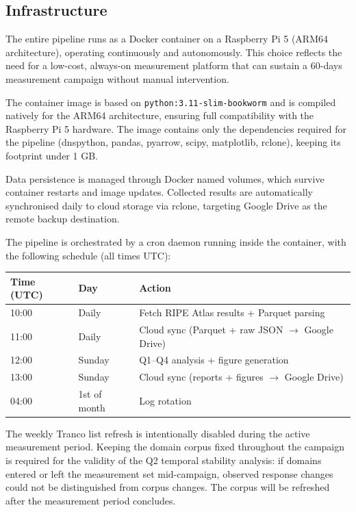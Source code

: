 \subsection{Infrastructure}
\label{subsec:3.1.3}

The entire pipeline runs as a Docker container on a Raspberry Pi 5 (ARM64 architecture), operating continuously and autonomously. This choice reflects the need for a low-cost, always-on measurement platform that can sustain a 60-days measurement campaign without manual intervention.

The container image is based on \texttt{python:3.11-slim-bookworm} and is compiled natively for the ARM64 architecture, ensuring full compatibility with the Raspberry Pi 5 hardware. The image contains only the dependencies required for the pipeline (dnspython, pandas, pyarrow, scipy, matplotlib, rclone), keeping its footprint under 1 GB.

Data persistence is managed through Docker named volumes, which survive container restarts and image updates. Collected results are automatically synchronised daily to cloud storage via rclone, targeting Google Drive as the remote backup destination.

The pipeline is orchestrated by a cron daemon running inside the container, with the following schedule (all times UTC):

\begin{table}[H]
\centering
\small
\begin{tabular}{l l l}
\toprule
\textbf{Time (UTC)} & \textbf{Day} & \textbf{Action} \\
\midrule
10:00 & Daily & Fetch RIPE Atlas results + Parquet parsing \\
11:00 & Daily & Cloud sync (Parquet + raw JSON $\rightarrow$ Google Drive) \\
12:00 & Sunday & Q1--Q4 analysis + figure generation \\
13:00 & Sunday & Cloud sync (reports + figures $\rightarrow$ Google Drive) \\
04:00 & 1st of month & Log rotation \\
\bottomrule
\end{tabular}
\end{table}

The weekly Tranco list refresh is intentionally disabled during the active measurement period. Keeping the domain corpus fixed throughout the campaign is required for the validity of the Q2 temporal stability analysis: if domains entered or left the measurement set mid-campaign, observed response changes could not be distinguished from corpus changes. The corpus will be refreshed after the measurement period concludes.

